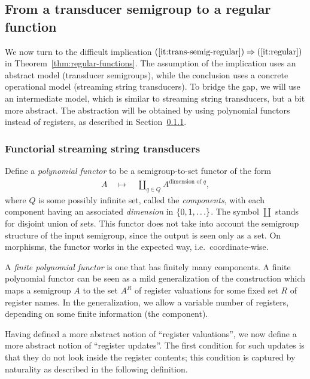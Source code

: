 \subsection{From a transducer semigroup to a regular function}
\label{sec:hard}
We now turn to the difficult implication $(\ref{it:trans-semig-regular}) \Rightarrow (\ref{it:regular})$ in Theorem~\ref{thm:regular-functions}. 
The assumption of the implication uses an abstract model (transducer semigroups), while the conclusion uses a concrete operational model (streaming string transducers). To bridge the gap, we will use an intermediate model, which is similar to streaming string transducers, but a bit more abstract. The abstraction will be obtained by using polynomial functors instead of registers, as described in Section~\ref{sec:abstract-sst}.
\subsubsection{Functorial streaming string transducers}
\label{sec:abstract-sst}



Define a \emph{polynomial functor} to be a semigroup-to-set functor of the form
\begin{align*}
A \quad \mapsto \quad \coprod_{q \in Q} A^{\text{dimension of } q},
\end{align*}
where $Q$ is some possibly infinite set, called the \emph{components}, with each  component having an associated \emph{dimension} in $\{0,1,\ldots\}$. The symbol $\coprod$ stands for disjoint union of sets. This functor does not take into account the semigroup structure of the input semigroup, since the output is seen only as a set.
On morphisms, the functor works in the expected way, i.e.~coordinate-wise.  

A \emph{finite polynomial functor} is one that has finitely many components. 
A finite polynomial functor can be seen as a mild generalization of the construction which maps a semigroup $A$ to the set $A^R$ of register valuations for some fixed set $R$ of register names.  In the generalization, we allow a variable number of registers, depending on some finite information (the component). 

Having defined a more abstract notion of ``register valuations'', we now define a more abstract notion of ``register updates''.  The first condition for such updates is that they do not look inside the register contents; this condition is captured by naturality as described in the following definition. 



